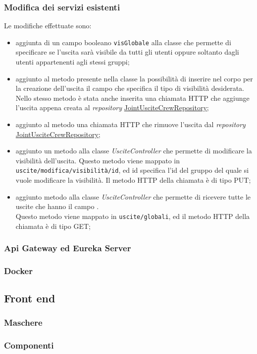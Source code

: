 \subsubsection{Modifica dei servizi esistenti}
Le modifiche effettuate sono: 
\begin{itemize}
    \item aggiunta di un campo booleano \texttt{visGlobale} alla classe  che permette di specificare se l'uscita sarà visibile da tutti gli utenti oppure soltanto dagli utenti appartenenti agli stessi gruppi;
    \item aggiunto al metodo  presente nella classe  la possibilità di inserire nel corpo per la creazione dell'uscita il campo che specifica il tipo di visibilità desiderata. \\
    Nello stesso metodo è stata anche inserita una chiamata HTTP che aggiunge l'uscita appena creata al \textit{repository} \hyperref[JointUsciteCrewRepository]{JointUsciteCrewRepository};
    \item aggiunto al metodo  una chiamata HTTP che rimuove l'uscita dal \textit{repository} \hyperref[JointUsciteCrewRepository]{JointUsciteCrewRepository};
    \item aggiunto un metodo   alla classe \textit{UsciteController} che permette di modificare la visibilità dell'uscita.
    Questo metodo viene mappato in \texttt{uscite/modifica/visibilità/{id}}, ed id specifica l'id del gruppo del quale si vuole modificare la visibilità. Il metodo HTTP della chiamata è di tipo PUT; 
    \item aggiunto metodo   alla classe \textit{UsciteController} che permette di ricevere tutte le uscite che hanno il campo . \\
    Questo metodo viene mappato in \texttt{uscite/globali}, ed il metodo HTTP della chiamata è di tipo GET; 
\end{itemize}


\subsubsection{Api Gateway ed Eureka Server}
\subsubsection{Docker}

\subsection{Front end}
\subsubsection{Maschere}
\subsubsection{Componenti}